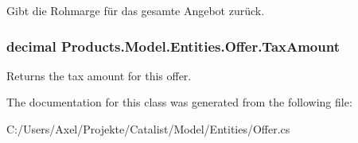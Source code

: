 Gibt die Rohmarge für das gesamte Angebot zurück. 

\subsubsection[{\texorpdfstring{Tax\+Amount}{TaxAmount}}]{\setlength{\rightskip}{0pt plus 5cm}decimal Products.\+Model.\+Entities.\+Offer.\+Tax\+Amount\hspace{0.3cm}{\ttfamily [get]}}\hypertarget{class_products_1_1_model_1_1_entities_1_1_offer_af1c3e80fef5bb8cce6b9edb8f88b8aa8}{}\label{class_products_1_1_model_1_1_entities_1_1_offer_af1c3e80fef5bb8cce6b9edb8f88b8aa8}


Returns the tax amount for this offer. 



The documentation for this class was generated from the following file\+:\begin{DoxyCompactItemize}
\item 
C\+:/\+Users/\+Axel/\+Projekte/\+Catalist/\+Model/\+Entities/Offer.\+cs\end{DoxyCompactItemize}
